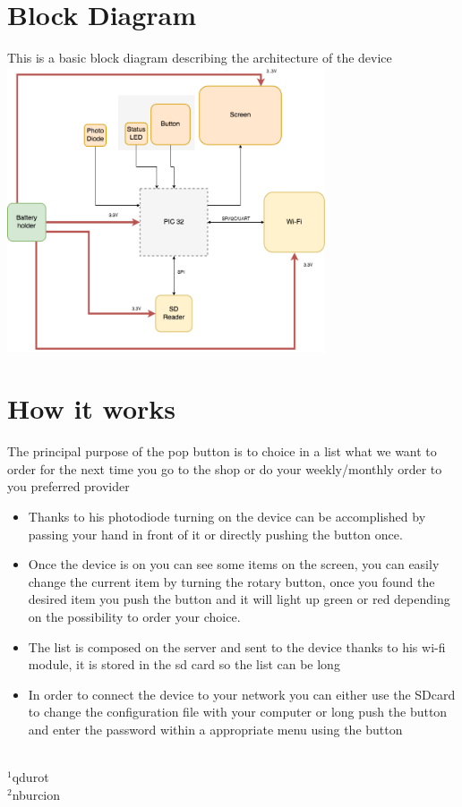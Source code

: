 \documentclass[
10pt,
a4paper,
]{article}
\begin{document}
\section{Block Diagram}
This is a basic block diagram describing the architecture of the device
\includegraphics[width=3.7in]{block-diagram.png}

\section{How it works}
The principal purpose of the pop button is to choice in a list what we want to order for the next time you go to the shop or do your weekly/monthly order to you preferred provider

\begin{itemize}
    \item Thanks to his photodiode turning on the device can be accomplished by passing your hand in front of it or directly pushing the button once.
    \item Once the device is on you can see some items on the screen, you can easily change the current item by turning the rotary button, once you found the desired item you push the button and it will light up green or red depending on the possibility to order your choice.
    \item The list is composed on the server and sent to the device thanks to his wi-fi module, it is stored in the sd card so the list can be long 
    \item In order to connect the device to your network you can either use the SDcard to change the configuration file with your computer or long push the button and enter the password within a appropriate menu using the button
\end{itemize}

\footnotesize


{
\mbox{}\\
$^1$qdurot \\
$^2$nburcion \\
}
\end{document}
